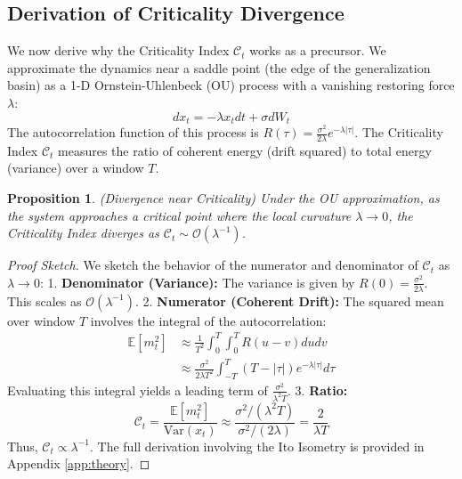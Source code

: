 \documentclass{article}
\theoremstyle{plain}
\newtheorem{proposition}[theorem]{Proposition}
\theoremstyle{definition}
\theoremstyle{remark}
\newcommand{\C}{\mathcal{C}} %
\newcommand{\E}{\mathbb{E}}
\newcommand{\var}{\text{Var}}
\begin{document}
\subsection{Derivation of Criticality Divergence}
We now derive why the Criticality Index $\C_t$ works as a precursor. We approximate the dynamics near a saddle point (the edge of the generalization basin) as a 1-D Ornstein-Uhlenbeck (OU) process with a vanishing restoring force $\lambda$:
\begin{equation}
    dx_t = -\lambda x_t dt + \sigma dW_t
\end{equation}
The autocorrelation function of this process is $R(\tau) = \frac{\sigma^2}{2\lambda} e^{-\lambda |\tau|}$.
The Criticality Index $\C_t$ measures the ratio of coherent energy (drift squared) to total energy (variance) over a window $T$.

\begin{proposition}
\label{prop:divergence}
(Divergence near Criticality) Under the OU approximation, as the system approaches a critical point where the local curvature $\lambda \to 0$, the Criticality Index diverges as $\C_t \sim \mathcal{O}(\lambda^{-1})$.
\end{proposition}

\begin{proof}[Proof Sketch]
We sketch the behavior of the numerator and denominator of $\C_t$ as $\lambda \to 0$:
1.  \textbf{Denominator (Variance):} The variance is given by $R(0) = \frac{\sigma^2}{2\lambda}$. This scales as $\mathcal{O}(\lambda^{-1})$.
2.  \textbf{Numerator (Coherent Drift):} The squared mean over window $T$ involves the integral of the autocorrelation:
    \begin{align}
        \E[m_t^2] &\approx \frac{1}{T^2} \int_0^T \int_0^T R(u-v) du dv \nonumber \\
        &\approx \frac{\sigma^2}{2\lambda T^2} \int_{-T}^{T} (T-|\tau|) e^{-\lambda|\tau|} d\tau
    \end{align}
    Evaluating this integral yields a leading term of $\frac{\sigma^2}{\lambda^2 T}$.
3.  \textbf{Ratio:}
    \begin{equation}
        \C_t = \frac{\E[m_t^2]}{\var(x_t)} \approx \frac{\sigma^2 / (\lambda^2 T)}{\sigma^2 / (2\lambda)} = \frac{2}{\lambda T}
    \end{equation}
Thus, $\C_t \propto \lambda^{-1}$. The full derivation involving the Ito Isometry is provided in Appendix \ref{app:theory}.
\end{proof}
\end{document}
